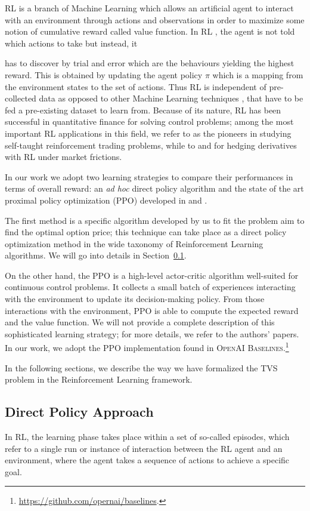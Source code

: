\documentclass[runningheads]{m2ef}
\newcommand\soutpars[1]{\let\helpcmd\sout\parhelp#1\par\relax\relax}
\newcommand{\change}[1]{{\color{red} {#1}}}%
\newcommand{\remove}[1]{{\color{red} \soutpars{{#1}}}}%
\begin{document}
\remove{Reinforcement Learning} \change{RL} is a branch of Machine Learning which allows an artificial agent to interact with an environment through actions and observations in order to maximize some notion of cumulative reward \change{called value function}. In RL\change{,} the agent is not told which actions to take but instead, it \remove{must} \change{has to} discover by trial and error which are the behaviours  yielding the highest reward. This is obtained by updating the agent policy $\pi$ which is a mapping from the environment states to the set of actions. Thus RL is independent of pre-collected data as opposed to other Machine Learning techniques\change{, that have to be fed a pre-existing dataset to learn from}. Because of its nature, RL has been successful in quantitative finance for solving control problems; among the most important RL applications in this field, we refer to \cite{Deng2017} as the pioneers in studying self-taught reinforcement trading problems, while to \cite{Halperin2020} and \cite{Kolm2019} for hedging derivatives with RL under market frictions.

In our work we adopt two learning strategies to compare their performances in terms of overall reward: an \textit{ad hoc} direct policy algorithm and the state of the art proximal policy optimization (PPO) developed in \cite{Schulman2017} and \cite{Schulman2016}. 

The first method is a specific algorithm developed by us to fit the problem aim to find the optimal option price; this technique can take place as a direct policy optimization method in the wide taxonomy of Reinforcement Learning algorithms. We will go into details in Section~\ref{sec:direct_policy}.

On the other hand, the PPO is a high-level actor-critic algorithm well-suited for continuous control problems. It collects a small batch of experiences interacting with the environment to update its decision-making policy. From those interactions with the environment, PPO is able to compute the expected reward and the value function. We will not provide a complete description of this sophisticated learning strategy; for more details, we refer to the authors' papers. In our work, we adopt the PPO implementation found in \textsc{OpenAI Baselines}.\footnote{\url{https://github.com/opernai/baselines}.} 

In the following sections, we describe the way we have formalized the TVS problem in the Reinforcement Learning framework.


\subsection{Direct \change{P}olicy \change{A}pproach}\label{sec:direct_policy}
\change{In RL, the learning phase takes place within a set of so-called episodes, which refer to a single run or instance of interaction between the RL agent and an environment, where the agent takes a sequence of actions to achieve a specific goal.}
\end{document}
